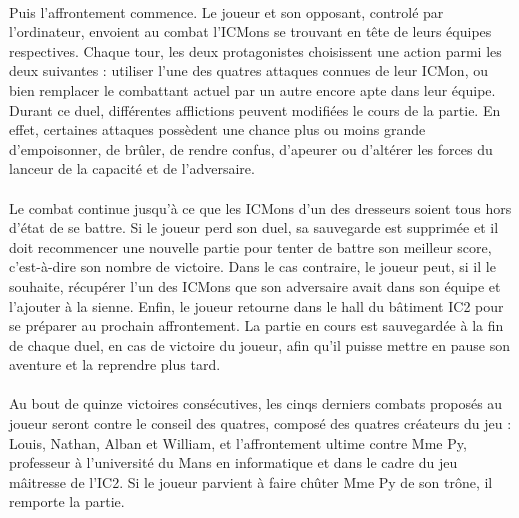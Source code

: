 \documentclass[12pt,a4paper, twoside]{article}
\begin{document}
        \paragraph{} Puis l'affrontement commence. Le joueur et son opposant, controlé par l'ordinateur, envoient au combat l'ICMons se trouvant en tête de leurs équipes respectives. Chaque tour, les deux protagonistes choisissent une action parmi les deux suivantes : utiliser l'une des quatres attaques connues de leur ICMon, ou bien remplacer le combattant actuel par un autre encore apte dans leur équipe.
        Durant ce duel, différentes afflictions peuvent modifiées le cours de la partie. En effet, certaines attaques possèdent une chance plus ou moins grande d'empoisonner, de brûler, de rendre confus, d'apeurer ou d'altérer les forces du lanceur de la capacité et de l'adversaire. \paragraph{}
        Le combat continue jusqu'à ce que les ICMons d'un des dresseurs soient tous hors d'état de se battre. Si le joueur perd son duel, sa sauvegarde est supprimée et il doit recommencer une nouvelle partie pour tenter de battre son meilleur score, c'est-à-dire son nombre de victoire.
        Dans le cas contraire, le joueur peut, si il le souhaite, récupérer l'un des ICMons que son adversaire avait dans son équipe et l'ajouter à la sienne. Enfin, le joueur retourne dans le hall du bâtiment IC2 pour se préparer au prochain affrontement.
        La partie en cours est sauvegardée à la fin de chaque duel, en cas de victoire du joueur, afin qu'il puisse mettre en pause son aventure et la reprendre plus tard. \paragraph{}
        Au bout de quinze victoires consécutives, les cinqs derniers combats proposés au joueur seront contre le conseil des quatres, composé des quatres créateurs du jeu : Louis, Nathan, Alban et William, et l'affrontement ultime contre Mme Py, professeur à l'université du Mans en informatique et dans le cadre du jeu mâitresse de l'IC2.
        Si le joueur parvient à faire chûter Mme Py de son trône, il remporte la partie. 


\newpage
\end{document}
